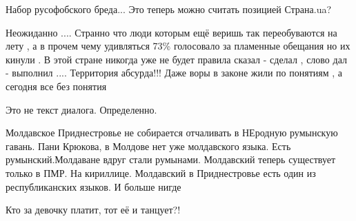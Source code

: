 \begin{itemize}
 
Набор русофобского бреда... Это теперь можно считать позицией Страна.ua?

 

Неожиданно .... Странно что люди которым ещё веришь так переобуваются на лету ,
а в прочем чему удивляться 73\% голосовало за пламенные обещания но их кинули .
В этой стране никогда уже не будет правила сказал - сделал , слово дал -
выполнил .... Территория абсурда!!! Даже воры в законе жили по понятиям , а
сегодня все без понятия

 
Это не текст диалога. Определенно.

 
Молдавское Приднестровье не собирается отчаливать в НЕродную румынскую гавань. Пани Крюкова, в Молдове нет уже молдавского языка. Есть румынский.Молдаване вдруг стали румынами. Молдавский теперь существует только в ПМР. На кириллице. Молдавский в Приднестровье есть один из республиканских языков. И больше нигде

 
Кто за девочку платит, тот её и танцует?!

\begin{itemize}
 

\end{itemize}
\end{itemize}
